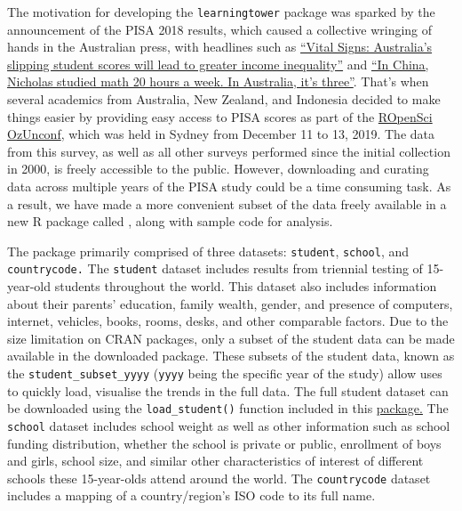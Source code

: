 The motivation for developing the \texttt{learningtower} package was
sparked by the announcement of the PISA 2018 results, which caused a
collective wringing of hands in the Australian press, with headlines
such as
\href{https://theconversation.com/vital-signs-australias-slipping-student-scores-will-lead-to-greater-income-inequality-128301}{``Vital
Signs: Australia's slipping student scores will lead to greater income
inequality''} and
\href{https://www.smh.com.au/education/in-china-nicholas-studied-maths-20-hours-a-week-in-australia-it-s-three-20191203-p53ggv.html}{``In
China, Nicholas studied math 20 hours a week. In Australia, it's
three''}. That's when several academics from Australia, New Zealand, and
Indonesia decided to make things easier by providing easy access to PISA
scores as part of the \href{https://ozunconf19.ropensci.org/}{ROpenSci
OzUnconf}, which was held in Sydney from December 11 to 13, 2019. The
data from this survey, as well as all other surveys performed since the
initial collection in 2000, is freely accessible to the public. However,
downloading and curating data across multiple years of the PISA study
could be a time consuming task. As a result, we have made a more
convenient subset of the data freely available in a new R package called
, along with sample code for analysis.

The  package primarily comprised of three
datasets: \texttt{student}, \texttt{school}, and \texttt{countrycode.}
The \texttt{student} dataset includes results from triennial testing of
15-year-old students throughout the world. This dataset also includes
information about their parents' education, family wealth, gender, and
presence of computers, internet, vehicles, books, rooms, desks, and
other comparable factors. Due to the size limitation on CRAN packages,
only a subset of the student data can be made available in the
downloaded package. These subsets of the student data, known as the
\texttt{student\_subset\_yyyy} (\texttt{yyyy} being the specific year of
the study) allow uses to quickly load, visualise the trends in the full
data. The full student dataset can be downloaded using the
\texttt{load\_student()} function included in this
\href{https://kevinwang09.github.io/learningtower/}{package.} The
\texttt{school} dataset includes school weight as well as other
information such as school funding distribution, whether the school is
private or public, enrollment of boys and girls, school size, and
similar other characteristics of interest of different schools these
15-year-olds attend around the world. The \texttt{countrycode} dataset
includes a mapping of a country/region's ISO code to its full name.

